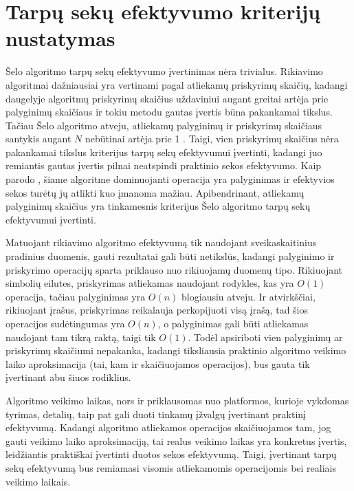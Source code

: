 \documentclass{VUMIFInfKursinis}
\begin{document}
\section{Tarpų sekų efektyvumo kriterijų nustatymas}

Šelo algoritmo tarpų sekų efektyvumo įvertinimas nėra trivialus.
Rikiavimo algoritmai dažniausiai yra vertinami pagal atliekamų priskyrimų skaičių, kadangi
daugelyje algoritmų priskyrimų skaičius uždaviniui augant greitai artėja prie palyginimų skaičiaus ir
tokiu metodu gautas įvertis būna pakankamai tikslus.
Tačiau Šelo algoritmo atveju, atliekamų palyginimų ir priskyrimų skaičiaus santykis augant $N$ nebūtinai artėja prie 1 \cite{Radavičius_Baranauskas_2013}.
Taigi, vien priskyrimų skaičius nėra pakankamai tikslus kriterijus tarpų sekų efektyvumui įvertinti,
kadangi juo remiantis gautas įvertis pilnai neatspindi praktinio sekos efektyvumo.
Kaip parodo \cite{ciura2001best}, šiame algoritme dominuojanti operacija yra palyginimas ir efektyvios sekos
turėtų jų atlikti kuo įmanoma mažiau.
Apibendrinant, atliekamų palyginimų skaičius yra tinkamesnis kriterijus Šelo algoritmo tarpų sekų efektyvumui įvertinti.

Matuojant rikiavimo algoritmo efektyvumą tik naudojant sveikaskaitinius pradinius duomenis, gauti rezultatai gali būti netikslūs,
kadangi palyginimo ir priskyrimo operacijų sparta priklauso nuo rikiuojamų duomenų tipo.
Rikiuojant simbolių eilutes, priskyrimas atliekamas naudojant rodykles, kas yra $O(1)$ operacija,
tačiau palyginimas yra $O(n)$ blogiausiu atveju.
Ir atvirkščiai, rikiuojant įrašus, priskyrimas reikalauja perkopijuoti visą įrašą, tad šios operacijos sudėtingumas yra $O(n)$,
o palyginimas gali būti atliekamas naudojant tam tikrą raktą, taigi tik $O(1)$.
Todėl apsiriboti vien palyginimų ar priskyrimų skaičiumi nepakanka, kadangi tiksliausia praktinio algoritmo
veikimo laiko aproksimacija (tai, kam ir skaičiuojamos operacijos), bus gauta tik įvertinant abu šiuos rodiklius.

Algoritmo veikimo laikas, nors ir priklausomas nuo platformos, kurioje vykdomas tyrimas, detalių,
taip pat gali duoti tinkamų įžvalgų įvertinant praktinį efektyvumą.
Kadangi algoritmo atliekamos operacijos skaičiuojamos tam, jog gauti
veikimo laiko aproksimaciją, tai realus veikimo laikas
yra konkretus įvertis, leidžiantis praktiškai įvertinti duotos sekos efektyvumą.
Taigi, įvertinant tarpų sekų efektyvumą bus remiamasi visomis atliekamomis operacijomis bei realiais veikimo laikais.
\end{document}
